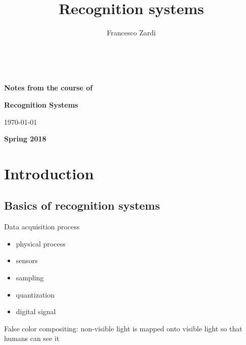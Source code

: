 \documentclass[oneside,onecolumn]{report}
\title{Recognition systems}
\author{Francesco Zardi}
\begin{document}
\begin{titlepage}\

        \vfill

        \begin{center}
            \huge \bfseries Notes from the course of \\
        \end{center}

        \begin{center}
            \huge \bfseries Recognition Systems \\
        \end{center}

        \vskip2cm

        \begin{center} \large
            \today
        \end{center}

        \vfill


    \vfill

    {
        \bfseries
        Spring 2018
    }
\end{titlepage}


\renewcommand{\thepage}{\roman{page}}
\tableofcontents

\clearpage

\renewcommand{\thepage}{\arabic{page}} %
\setcounter{page}{1} %

\setlength{\parindent}{0cm}


\chapter{Introduction}
\section{Basics of recognition systems}

Data acquisition process
\begin{itemize}
    \item physical process
    \item sensors
    \item sampling
    \item quantization
    \item digital signal
\end{itemize}

False color compositing: non-visible light is mapped onto visible light so that humans can see it
\end{document}
